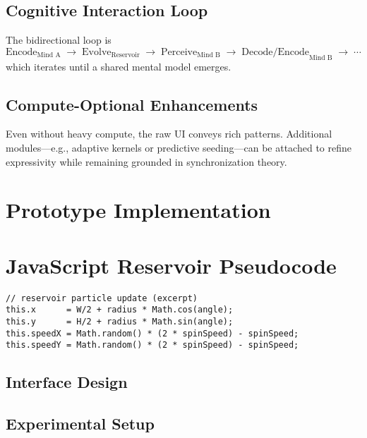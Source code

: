 \documentclass[12pt]{article}
\begin{document}
\subsection{Cognitive Interaction Loop}
The bidirectional loop is
\begin{equation*}
    \text{Encode}_{\text{Mind A}}\;\rightarrow\;\text{Evolve}_{\text{Reservoir}}\;\rightarrow\;\text{Perceive}_{\text{Mind B}}\;\rightarrow\;\text{Decode/Encode}_{\text{Mind B}}\;\rightarrow\;\cdots
\end{equation*}
which iterates until a shared mental model emerges.

\subsection{Compute-Optional Enhancements}
Even without heavy compute, the raw UI conveys rich patterns. Additional modules—e.g., adaptive kernels or predictive seeding—can be attached to refine expressivity while remaining grounded in synchronization theory.
\section{Prototype Implementation}
\section{JavaScript Reservoir Pseudocode}\label{app:pseudocode}
\begin{verbatim}
// reservoir particle update (excerpt)
this.x      = W/2 + radius * Math.cos(angle);
this.y      = H/2 + radius * Math.sin(angle);
this.speedX = Math.random() * (2 * spinSpeed) - spinSpeed;
this.speedY = Math.random() * (2 * spinSpeed) - spinSpeed;
\end{verbatim}

\subsection{Interface Design}

\subsection{Experimental Setup}
\end{document}
